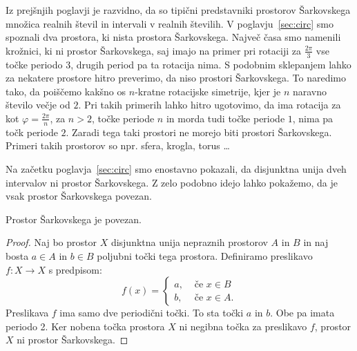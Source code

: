 \documentclass[../TG_magistrsko_delo_sections.tex]{subfiles}
\begin{document}

Iz prejšnjih poglavji je razvidno, da so tipični predstavniki prostorov Šarkovskega množica realnih števil in intervali v realnih številih. V poglavju~\ref{sec:circ} smo spoznali dva prostora, ki nista prostora Šarkovskega. Največ časa smo namenili krožnici, ki ni prostor Šarkovskega, saj imajo na primer pri rotaciji za $\frac{2\pi}{3}$ vse točke periodo $3$, drugih period pa ta rotacija nima.
S podobnim sklepanjem lahko za nekatere prostore hitro preverimo, da niso prostori Šarkovskega. To naredimo tako, da poiščemo kakšno os $n$-kratne rotacijske simetrije, kjer je $n$ naravno število večje od $2$. Pri takih primerih lahko hitro ugotovimo, da ima rotacija za kot $\varphi = \frac{2\pi}{n}$, za $n>2$, točke periode $n$ in morda tudi točke periode $1$, nima pa točk periode $2$. Zaradi tega taki prostori ne morejo biti prostori Šarkovskega. Primeri takih prostorov so npr. sfera, krogla, torus \dots 


Na začetku poglavja~\ref{sec:circ} smo enostavno pokazali, da disjunktna unija dveh intervalov ni prostor Šarkovskega. Z zelo podobno idejo lahko pokažemo, da je vsak prostor Šarkovskega povezan.


\begin{trditev}
Prostor Šarkovskega je povezan.
\end{trditev}
\begin{proof}
Naj bo prostor $X$ disjunktna unija nepraznih prostorov $A$ in $B$ in naj bosta $a \in A$ in $b \in B$ poljubni točki tega prostora. Definiramo preslikavo $f \colon X \to X$ s predpisom:
\[ f(x) = \begin{cases}
  a, & \mbox{ če $x \in B $}\\
  b ,& \mbox{ če $x \in A$.}
  \end{cases}
  \]
Preslikava $f$ ima samo dve periodični točki. To sta točki $a$ in $b$. Obe pa imata periodo 2. Ker nobena točka prostora $X$ ni negibna točka za preslikavo $f$, prostor $X$ ni prostor Šarkovskega.
\end{proof}
\end{document}
